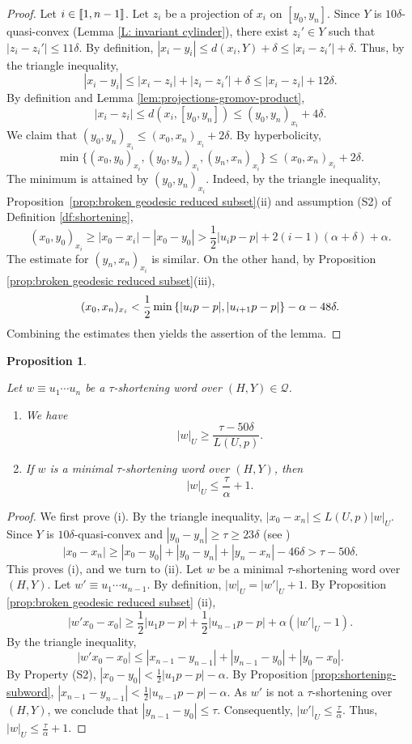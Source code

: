 \documentclass[leqno,a4paper,10pt]{amsart}
\theoremstyle{plain}
\newtheorem{prop}[thm]{Proposition}
\theoremstyle{definition}
\theoremstyle{remark}
\newcommand{\scrQ}{\mathscr{Q}}
\let\le\leqslant
\let\ge\geqslant
\newcommand{\zinterval}[2]{
	\mathchoice%
	{\left \llbracket #1, \cdots, #2 \right \rrbracket}%
	{\llbracket #1, #2 \rrbracket}%
	{\llbracket #1, #2 \rrbracket}%
	{\llbracket #1, #2 \rrbracket}%
}
\begin{document}
\begin{proof}
Let $i\in\zinterval{1}{n-1}$. Let $z_i$ be a projection of $x_i$ on $[y_0,y_n]$. Since $Y$ is $10\delta$-quasi-convex (Lemma \ref{L: invariant cylinder}), there exist $z_i'\in Y$ such that $|z_i-z_i'|\le 11\delta$. By definition,
$|x_i-y_i|\le d(x_i,Y)+\delta \le |x_i-z_i'|+\delta.$
Thus, by the triangle inequality,
$$|x_i-y_i|\le |x_i-z_i|+|z_i-z_i'|+\delta\le |x_i-z_i|+12\delta.$$
By definition and Lemma \ref{lem:projections-gromov-product}, 
$$|x_i-z_i|\le d(x_i,[y_0,y_n]) \le (y_0,y_n)_{x_i}+4\delta.$$
We claim that $(y_0,y_n)_{x_i}\le (x_0,x_n)_{x_i}+2\delta$. By hyperbolicity,
$$
\min\{(x_0,y_0)_{x_i},(y_0,y_n)_{x_i},(y_n,x_n)_{x_i}\}\le (x_0,x_n)_{x_i}+2\delta.
$$
The minimum is attained by $(y_0,y_n)_{x_i}$. Indeed, by the triangle inequality, Proposition~\ref{prop:broken geodesic reduced subset}(ii)  and assumption (S2) of Definition \ref{df:shortening}, 
$$(x_0,y_0)_{x_i}\ge |x_0-x_i| - |x_0-y_0| > \frac{1}{2}|u_{i}p-p|+ 2(i-1)(\alpha+\delta)+\alpha.$$ The estimate for $(y_n,x_n)_{x_i}$ is similar. On the other hand,   by Proposition \ref{prop:broken geodesic reduced subset}(iii), { $$(x_0,x_n)_{x_i} < \frac{1}{2}\min \qty {|u_ip-p|, |u_{i+1}p-p|}-\alpha-48\delta.$$ }
Combining the estimates then yields the assertion of the lemma. 
\end{proof}

\begin{prop}
	
	\label{prop:shortening-bounds}
	
	Let $w\equiv u_1\cdots u_n$ be a $\tau$-shortening word over $(H,Y)\in\scrQ$. 
	\begin{enumerate}[label=(\roman*)]
		\item We have
		$$|w|_U\ge \frac{\tau-50\delta}{L(U,p)}.$$
		\item If $w$ is a minimal $\tau$-shortening word over $(H,Y)$, then
		$$|w|_U\le \frac{\tau}{\alpha}+1.$$
	\end{enumerate}
\end{prop}

\begin{proof} We first prove (i). By the triangle inequality,
		$|x_0-x_n|\le L(U,p) |w|_U.$
		 Since $Y$ is $10\delta$-quasi-convex and $|y_0-y_n|\ge \tau \ge 23\delta$ (see \cite[Chapitre 2, Proposition 2.1]{coornaert_geometrie_1990})
		$$|x_0-x_n|\ge |x_0-y_0|+|y_0-y_n|+|y_n-x_n|-46\delta>\tau-50\delta.$$
	This proves (i), and we turn to (ii). 	
Let $w$ be a minimal $\tau$-shortening word over $(H,Y)$. Let $w'\equiv u_1\cdots u_{n-1}$. By definition,
		$|w|_U=|w'|_U+1.$
		By Proposition \ref{prop:broken geodesic reduced subset} (ii), 
		$$
		|w'x_0-x_0|\ge \frac{1}{2}|u_1p-p|+\frac{1}{2}|u_{n-1}p-p|+\alpha(|w'|_U-1).
		$$
		By the triangle inequality,
		$$		|w'x_0-x_0| \le |x_{n-1}-y_{n-1}|+|y_{n-1}-y_0|+|y_0-x_0|. 
		$$		
		By Property (S2), $
		|x_0-y_0| < \frac{1}{2} |u_1p-p|-\alpha.
		$
		By Proposition \ref{prop:shortening-subword}, 
		$
		|x_{n-1}-y_{n-1}| < \frac{1}{2} |u_{n-1}p-p|-\alpha.
		$
		As $w'$ is not a $\tau$-shortening over $(H,Y)$, we conclude that $|y_{n-1}-y_0| \le \tau$. Consequently, $|w'|_U\le \frac{\tau}{\alpha}$. Thus, $|w|_U\le \frac{\tau}{\alpha}+1$.
\end{proof}
\end{document}
